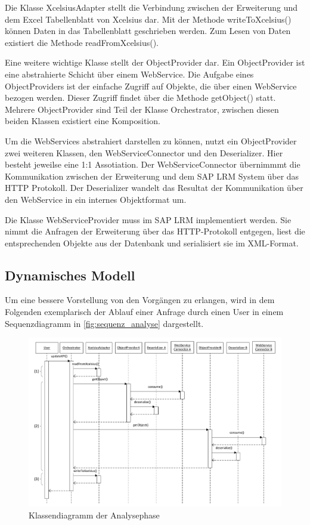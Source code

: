 Die Klasse XcelsiusAdapter stellt die Verbindung zwischen der Erweiterung und dem Excel Tabellenblatt von Xcelsius dar. Mit der Methode writeToXcelsius() können Daten in das Tabellenblatt geschrieben werden. Zum Lesen von Daten existiert die Methode readFromXcelsius().

Eine weitere wichtige Klasse stellt der ObjectProvider dar. Ein ObjectProvider ist eine abstrahierte Schicht über einem WebService. Die Aufgabe eines ObjectProviders ist der einfache Zugriff auf Objekte, die über einen WebService bezogen werden. Dieser Zugriff findet über die Methode getObject() statt. Mehrere ObjectProvider sind Teil der Klasse Orchestrator, zwischen diesen beiden Klassen existiert eine Komposition.

Um die WebServices abstrahiert darstellen zu können, nutzt ein ObjectProvider zwei weiteren Klassen, den WebServiceConnector und den Deserializer. Hier besteht jeweilse eine 1:1 Assotiation. Der WebServiceConnector übernimmmt die Kommunikation zwischen der Erweiterung und dem SAP LRM System über das HTTP Protokoll. Der Deserializer wandelt das Resultat der Kommunikation über den WebService in ein internes Objektformat um.

Die Klasse WebServiceProvider muss im SAP LRM implementiert werden. Sie nimmt die Anfragen der Erweiterung über das HTTP-Protokoll entgegen, liest die entsprechenden Objekte aus der Datenbank und serialisiert sie im XML-Format.

\subsection{Dynamisches Modell}
Um eine bessere Vorstellung von den Vorgängen zu erlangen, wird in dem Folgenden exemplarisch der Ablauf einer Anfrage durch einen User in einem Sequenzdiagramm in \vref{fig:sequenz_analyse} dargestellt.

\begin{figure}[h]
\centering
\setlength{\unitlength}{1mm}
\includegraphics[width=15cm]{Visio/Analyse-Sequenz.pdf}
\caption{Klassendiagramm der Analysephase\label{fig:sequenz_analyse}}
\end{figure}

